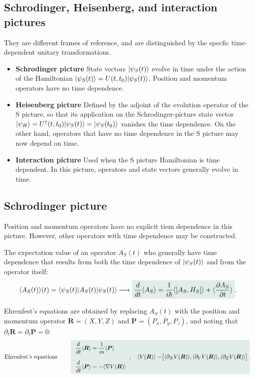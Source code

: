 \subsection{Schrodinger, Heisenberg, and interaction pictures}
They are different frames of reference, and are distinguished by the specfic time-dependent unitary transformations.
\begin{itemize}[itemsep=0pt,topsep=0pt]
    \item\textbf{Schrodinger picture} State vectors $|\psi_S(t)\rangle$ evolve in time under the action of the Hamiltonian $|\psi_S(t)\rangle=U(t,t_0)|\psi_S(t)\rangle$. Position and momentum operators have no time dependence.
    \item\textbf{Heisenberg picture} Defined by the adjoint of the evolution operator of the S picture, so that its application on the Schrodinger-picture state vector $|\psi_H\rangle=U^\dagger(t,t_0)|\psi_S(t)\rangle=|\psi_S(t_0)\rangle$ 
    vanishes the time dependence. On the other hand, operators that have no time dependence in the S picture may now depend on time.
    \item\textbf{Interaction picture} Used when the S picture Hamiltonian is time dependent. In this picture, operators and state vectors generally evolve in time.
\end{itemize}
\subsection{Schrodinger picture}
Position and momentum operators have no explicit tiem dependence in this picture. However, other operators with time dependence may be constructed.

The expectation value of an operator $A_S(t)$ who generally have time dependence that results from both the time dependence of $|\psi_S(t)\rangle$ and from the operator itself:
\begin{align}
    \braket{A_S(t)}(t)=\braket{\psi_S(t)|A_S(t)|\psi_S(t)}\longrightarrow\highlight{\frac{d}{dt}\braket{A_S}=\frac{1}{i\hbar}\braket{[A_S,H_S]}+\braket{\frac{\partial A_S}{\partial t}}}.
\end{align}

Ehrenfest's equations are obtained by replacing $A_S(t)$ with the position and momentum operator $\bm{R}=(X,Y,Z)$ and $\bm{P}=(P_x,P_y,P_z)$, and noting that $\partial_t\bm{R}=\partial_t\bm{P}=0$:
\begin{align}
    \text{Ehrenfest's equations }\qquad\highlight{\begin{array}{l}
        \dfrac{d}{dt}\braket{\bm{R}}=\dfrac{1}{m}\braket{\bm{P}}\\\\
        \dfrac{d}{dt}\braket{\bm{P}}=-\braket{\nabla V(\bm{R})}
    \end{array},\quad\braket{V(\bm{R})}=\bigr[\braket{\partial_XV(\bm{R})},\braket{\partial_YV(\bm{R})},\braket{\partial_ZV(\bm{R})}\bigr]}.
\end{align}
